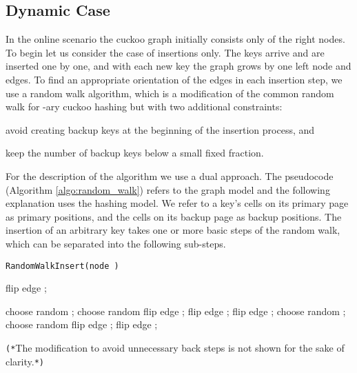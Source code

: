 \let\accentvec\vec \documentclass{llncs}
\begin{document}
\subsection{Dynamic Case}
\label{sec:randomWalk}
In the online scenario the cuckoo graph initially consists only of the right nodes. To begin let us consider the case of insertions only.  The keys arrive and are inserted one by one,
and with each new key the graph grows by one left node and  edges. To find an appropriate orientation of the edges in each insertion step, we use a random walk algorithm, which is a modification of the common random walk for -ary cuckoo hashing \cite{FotakisPSS2005} but with two additional constraints:
\begin{compactenum}
 \item avoid creating backup keys at the beginning of the insertion process, and
 \item keep the number of backup keys below a small fixed fraction.
\end{compactenum}
For the description of the algorithm we use a dual approach. The pseudocode (Algorithm \ref{algo:random_walk})
refers to the graph model and the following explanation uses the hashing model.
We refer to a key's  cells on its primary page as primary positions, and the
 cells on its backup page as backup positions.
The insertion of an arbitrary key  takes one or more basic steps of the random walk,
which can be separated into the following sub-steps.
\begin{algorithm}[!ht] 

\small
\caption{\texttt{RandomWalkInsert(\textsf{node} )}\label{algo:random_walk}}


\newcommand{\od}{\mathrm{outdeg}}
\newcommand{\suc}{\mathrm{success}}

\newcommand{\rn}{\texttt{randomNumber()}}



\;
\While{ \KwAnd \KwNot }
{
    {
            flip edge ; \;
        
    }

    \If{\KwNot }
    {
        \eIf{ \emph{\rn}}
        {
                choose random ;
                choose random \;
                flip edge ; flip edge ; \;
        }
        {
            {
                flip edge ; \;
            }
            {
                choose random ;
                choose random \;
                flip edge ; flip edge ; \;
            }
        }
    }
\;
}
\KwRet \;
{\scriptsize \textrm{\texttt{(*}The modification to avoid unnecessary back steps is not shown for the sake of clarity.\texttt{*)}}}
\end{algorithm}
\end{document}
